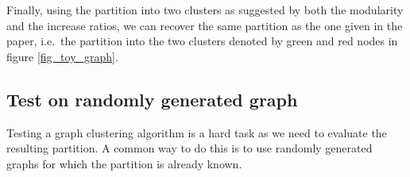 \documentclass[12pt]{article}
\theoremstyle{definition}
\begin{document}

Finally, using the partition into two clusters as suggested by both the modularity and the increase ratios, we can recover the same partition as the one given in the paper, i.e.\ the partition into the two clusters denoted by green and red nodes in figure \ref{fig_toy_graph}.

\subsection{Test on randomly generated graph}
Testing a graph clustering algorithm is a hard task as we need to evaluate the resulting partition. A common way to do this is to use randomly generated graphs for which the partition is already known.
\end{document}
